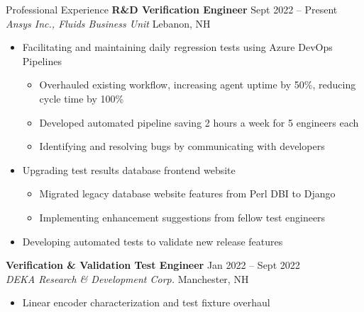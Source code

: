 \documentclass{resume}
\begin{document}
\begin{rSection}{Professional Experience}
    {\textbf{R\&D Verification Engineer}} \hfill {Sept 2022 -- Present}
    \\{\em Ansys Inc., Fluids Business Unit} \hfill {Lebanon, NH}
    \vspace{-0.5em}
    \begin{itemize}[label={\tiny\raisebox{1ex}{\textbullet}}, noitemsep]
        \item Facilitating and maintaining daily regression tests using Azure DevOps Pipelines
        \begin{itemize}[label={\tiny\raisebox{1ex}{\textbullet}}, noitemsep]
            \item Overhauled existing workflow, increasing agent uptime by 50\%, reducing cycle time by 100\%
            \item Developed automated pipeline saving 2 hours a week for 5 engineers each 
            \item Identifying and resolving bugs by communicating with developers
        \end{itemize}
        \item Upgrading test results database frontend website
        \begin{itemize}[label={\tiny\raisebox{1ex}{\textbullet}}, noitemsep]
            \item Migrated legacy database website features from Perl DBI to Django 
            \item Implementing enhancement suggestions from fellow test engineers
        \end{itemize}
        \item Developing automated tests to validate new release features
    \end{itemize}
    \vspace{-0.4em}
    {\textbf{Verification \& Validation Test Engineer}} \hfill {Jan 2022 -- Sept 2022}
    \\{\em DEKA Research \& Development Corp.} \hfill {Manchester, NH}
    \vspace{-0.5em}
    \begin{itemize}[label={\tiny\raisebox{1ex}{\textbullet}}, noitemsep]
        \item Linear encoder characterization and test fixture overhaul

\end{itemize}
\end{rSection}
\end{document}
